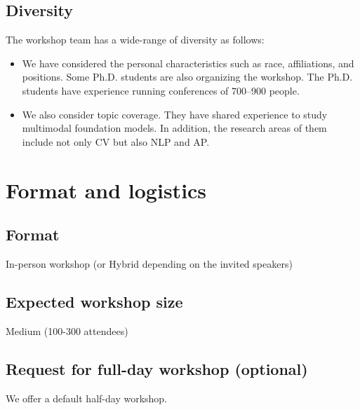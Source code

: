 \documentclass{article}
\begin{document}
\subsection{Diversity}
The workshop team has a wide-range of diversity as follows:
\begin{itemize}
    \item We have considered the personal characteristics such as race, affiliations, and positions. Some Ph.D. students are also organizing the workshop. The Ph.D. students have experience running conferences of 700–900 people.

    \item We also consider topic coverage. They have shared experience to study multimodal  foundation models. In addition, the research areas of them include not only CV but also NLP and AP.
\end{itemize}

\section{Format and logistics}
\subsection{Format}
In-person workshop (or Hybrid depending on the invited speakers)

\subsection{Expected workshop size}
Medium (100-300 attendees)

\subsection{Request for full-day workshop (optional)}
We offer a default half-day workshop.
\end{document}
